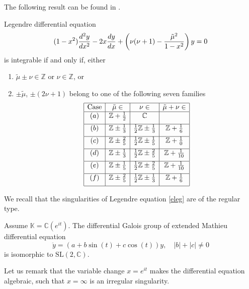 \documentclass[final]{siamart0516}
\begin{document}
The following result can be found in \cite{almp}.
\begin{theorem}\label{almp}
         Legendre differential equation
         \begin{equation}\label{eleg}
         (1-x^2){d^2y\over dx^2} -2x{dy\over dx}+\left({\nu(\nu+1)}-{\tilde\mu^2\over 1-x^2}\right)y=0
         \end{equation} is integrable if and only if,
         either
         \begin{enumerate}
              \item $\tilde\mu\pm \nu\in\mathbb{Z}$ or $\nu\in\mathbb{Z}$, or
              \item $\pm \tilde\mu$, $\pm (2\nu+1)$ belong to one of the following seven families
              \[
              \begin{array}{|c|c|c|c|} \hline
              \mbox{Case} &\tilde\mu \in & \nu \in & \tilde\mu + \nu \in \\ \hline
              (a) & \mathbb{Z} +\frac{1}{2}  & \mathbb{C}                          &                 \\[1.2ex]  \hline
              (b) & \mathbb{Z}\pm\frac{1}{3} & \frac{1}{2}\mathbb{Z}\pm\frac{1}{3} & \mathbb{Z}+\frac{1}{6} \\[1.2ex]  \hline
              (c) & \mathbb{Z}\pm\frac{2}{5} & \frac{1}{2}\mathbb{Z}\pm\frac{1}{5} & \mathbb{Z}+\frac{1}{0} \\[1.2ex]  \hline
              (d) & \mathbb{Z}\pm\frac{1}{3} & \frac{1}{2}\mathbb{Z}\pm\frac{2}{5} & \mathbb{Z}+\frac{1}{10} \\[1.2ex]  \hline
              (e) & \mathbb{Z}\pm\frac{1}{5} & \frac{1}{2}\mathbb{Z}\pm\frac{2}{5} & \mathbb{Z}+\frac{1}{10} \\[1.2ex] \hline
              (f) & \mathbb{Z}\pm\frac{2}{5} & \frac{1}{2}\mathbb{Z}\pm\frac{1}{3} & \mathbb{Z}+\frac{1}{6} \\[1.2ex] \hline
              \end{array}       \]
\end{enumerate}
    \end{theorem}
    We recall that the singularities of Legendre equation \eqref{eleg} are of the regular type.
    \begin{theorem}\label{acbl}
         Assume $\mathbb{K}=\mathbb{C}(e^{i t})$. The differential Galois group of extended Mathieu differential equation 
$$
 \ddot y=(a+b\sin(t)+c\cos(t))y,\quad |b| + |c|\neq 0$$ 
         is isomorphic to $\mathrm{SL(2,\mathbb{C})}$.  
    \end{theorem}     
 Let us remark that the  variable change  $x =e^{it}$ makes  the differential
equation algebraic, such that $x=\infty$ is an irregular singularity.
 
\end{document}
